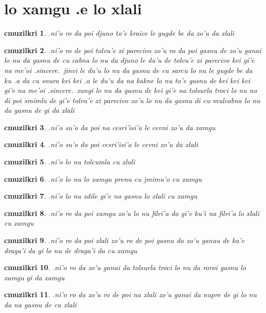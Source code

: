 \documentclass{report}
\newtheorem{cmuzilkri}{cmuzilkri}
\begin{document}
\section{lo xamgu .e lo xlali}
\begin{cmuzilkri}
	.ni'o ro da poi djuno to'e kraice le gugde be da zo'u da xlali
\end{cmuzilkri}
\begin{cmuzilkri}
	.ni'o ro de poi tolvu'e xi parecivo zo'u ro da poi gasnu de zo'u ganai lo nu da gasnu de cu cabna lo nu da djuno le du'u de tolvu'e xi parecivo kei gi'e na me'oi .sincere.\ jinvi le du'u lo nu da gasnu de cu sarcu lo nu le gugde be da ku .a da cu snura kei kei .a le du'u da na kakne lo nu to'e gasnu de kei kei kei gi'e na me'oi .sincere.\ zungi lo nu da gasnu de kei gi'e na tolsurla troci lo nu no di poi smimlu de gi'e tolvu'e xi parecivo zo'u lo nu da gasnu di cu mulcabna lo nu da gasnu de gi da xlali
\end{cmuzilkri}
\begin{cmuzilkri}
	.ni'o su'o da poi na cesri'isi'a le cevni zo'u da xamgu
\end{cmuzilkri}
\begin{cmuzilkri}
	.ni'o su'o da poi cesri'isi'a le cevni zo'u da xlali
\end{cmuzilkri}
\begin{cmuzilkri}
	.ni'o lo nu tolcumla cu xlali
\end{cmuzilkri}
\begin{cmuzilkri}
	.ni'o lo nu lo xamgu prenu cu jmimu'o cu xamgu
\end{cmuzilkri}
\begin{cmuzilkri}
	.ni'o lo nu zdile gi'e na gasnu lo xlali cu xamgu
\end{cmuzilkri}
\begin{cmuzilkri}
	.ni'o ro da poi xamgu zo'u lo nu filri'a da gi'e ku'i na filri'a lo xlali cu xamgu
\end{cmuzilkri}
\begin{cmuzilkri}
	.ni'o ro da poi xlali zo'u ro de poi gasnu da zo'u ganau de ka'e draga'i da gi lo nu de draga'i da cu xamgu
\end{cmuzilkri}
\begin{cmuzilkri}
	.ni'o ro da zo'u ganai da tolsurla troci lo nu da roroi gasnu lo xamgu gi da xamgu
\end{cmuzilkri}
\begin{cmuzilkri}
	.ni'o ro da zo'u ro de poi na xlali zo'u ganai da nupre de gi lo nu da na gasnu de cu xlali
\end{cmuzilkri}
\end{document}
